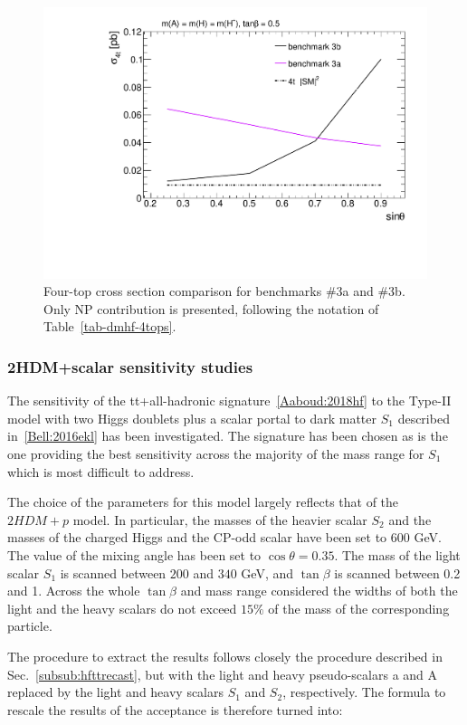 \begin{figure}
\centering
\includegraphics[width=.8\textwidth]{texinputs/04_grid/figures/DMHF/4tops/WHP_final_stscan.pdf}
\caption{Four-top cross section comparison for benchmarks \#3a and \#3b. Only NP contribution is presented, following the notation of Table~\ref{tab-dmhf-4tops}.}
\label{DMHF-4top-scan3}
\end{figure}

\subsubsection{2HDM+scalar sensitivity studies}

The sensitivity of the tt+\met all-hadronic signature~\ref{Aaboud:2018hf}
to the Type-II model with two Higgs doublets plus a 
scalar portal to dark matter $S_1$ described in~\ref{Bell:2016ekl} has been investigated.
The signature has been chosen as is the one providing the best sensitivity across the majority of the 
mass range for $S_1$ which is most difficult to address. 

The choice of the parameters for this model largely reflects that of the $2HDM+p$ model.
In particular, the masses of the heavier scalar $S_2$ and the masses of the charged Higgs and the CP-odd
scalar have been set to 600 GeV. The value of the mixing angle has been set to $\cos{\theta}=0.35$. 
The mass of the light scalar $S_1$ is scanned between $200$ and $340$ GeV, and $\tan\beta$ is scanned 
between 0.2 and 1. Across the whole $\tan\beta$ and mass range considered the widths of both the light and the heavy 
scalars do not exceed $15\%$ of the mass of the corresponding particle. 

The procedure to extract the results follows closely the procedure described in Sec.~\ref{subsub:hfttrecast}, 
but with the light and heavy pseudo-scalars a and A replaced by the light and heavy scalars
 $S_1$ and $S_2$, respectively.
The formula to rescale the results of the acceptance is therefore turned into:

